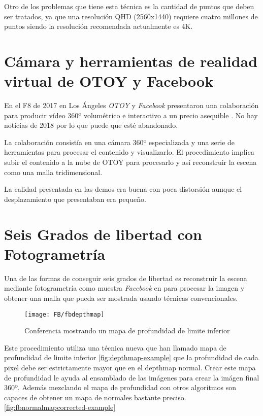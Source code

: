 Otro de los problemas que tiene esta técnica es la cantidad de puntos que deben ser tratados, ya que una resolución QHD (2560x1440) requiere cuatro millones de puntos siendo la resolución recomendada actualmente es 4K.


\section{Cámara y herramientas de realidad virtual de OTOY y Facebook}

En el F8 de 2017 en Los Ángeles \textit{OTOY} y \textit{Facebook} presentaron una colaboración para producir vídeo 360º volumétrico e interactivo a un precio asequible \cite{OtoyVR}. No hay noticias de 2018 por lo que puede que esté abandonado.

La colaboración consistía en una cámara 360º especializada y una serie de herramientas para procesar el contenido y visualizarlo. El procedimiento implica subir el contenido a la nube de OTOY para procesarlo y así reconstruir la escena como una malla tridimensional. 

La calidad presentada en las demos era buena con poca distorsión aunque el desplazamiento que presentaban era pequeño.

\section{Seis Grados de libertad con Fotogrametría}
Una de las formas de conseguir seis grados de libertad es reconstruir la escena mediante fotogrametría como muestra \textit{Facebook} en \cite{FBCasual3DCapture} para procesar la imagen y obtener una malla que pueda ser mostrada usando técnicas convencionales.

\begin{figure}[h]
  \centering
	\texttt{[image: FB/fbdepthmap]}
  \caption{Conferencia mostrando un mapa de profundidad de limite inferior}
  \label{fig:fbLBdepthmap-example}
\end{figure}

Este procedimiento utiliza una técnica nueva que han llamado mapa de profundidad de limite inferior \ref{fig:depthmap-example} que la profundidad de cada pixel debe ser estrictamente mayor que en el depthmap normal. Crear este mapa de profundidad le ayuda al ensamblado de las imágenes para crear la imágen final 360º. Además mezclando el mapa de profundidad con otros algoritmos son capaces de obtener un mapa de normales bastante preciso. \ref{fig:fbnormalmapcorrected-example}

